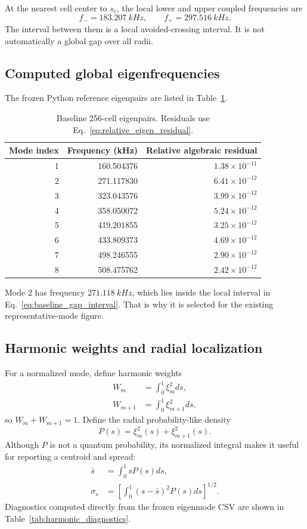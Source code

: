 At the nearest cell center to $s_c$, the local lower and upper coupled frequencies are
\begin{equation}
f_-=\SI{183.207}{kHz},
\qquad
f_+=\SI{297.516}{kHz}.
\label{eq:baseline_gap_interval}
\end{equation}
The interval between them is a local avoided-crossing interval. It is not automatically a global gap over all radii.

\subsection{Computed global eigenfrequencies}
The frozen Python reference eigenpairs are listed in Table~\ref{tab:baseline_eigenpairs_textbook}.

\begin{table}[htbp]
\centering
\begin{tabular}{r r r}
\toprule
Mode index & Frequency (kHz) & Relative algebraic residual\\
\midrule
1 & 160.504376 & $1.38\times10^{-11}$\\
2 & 271.117830 & $6.41\times10^{-12}$\\
3 & 323.043576 & $3.99\times10^{-12}$\\
4 & 358.050072 & $5.24\times10^{-12}$\\
5 & 419.201855 & $3.25\times10^{-12}$\\
6 & 433.809373 & $4.69\times10^{-12}$\\
7 & 498.246555 & $2.90\times10^{-12}$\\
8 & 508.475762 & $2.42\times10^{-12}$\\
\bottomrule
\end{tabular}
\caption{Baseline 256-cell eigenpairs. Residuals use Eq.~\eqref{eq:relative_eigen_residual}.}
\label{tab:baseline_eigenpairs_textbook}
\end{table}

Mode 2 has frequency $\SI{271.118}{kHz}$, which lies inside the local interval in Eq.~\eqref{eq:baseline_gap_interval}. That is why it is selected for the existing representative-mode figure.

\subsection{Harmonic weights and radial localization}
For a normalized mode, define harmonic weights
\begin{align}
W_m&=\int_0^1\xi_m^2ds,\\
W_{m+1}&=\int_0^1\xi_{m+1}^2ds,
\end{align}
so $W_m+W_{m+1}=1$. Define the radial probability-like density
\begin{equation}
P(s)=\xi_m^2(s)+\xi_{m+1}^2(s).
\end{equation}
Although $P$ is not a quantum probability, its normalized integral makes it useful for reporting a centroid and spread:
\begin{align}
\bar s&=\int_0^1sP(s)ds,\\
\sigma_s&=\left[\int_0^1(s-\bar s)^2P(s)ds\right]^{1/2}.
\end{align}
Diagnostics computed directly from the frozen eigenmode CSV are shown in Table~\ref{tab:harmonic_diagnostics}.

